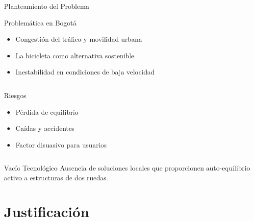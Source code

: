 \documentclass[10pt,xcolor={dvipsnames}]{beamer}
\begin{document}
\begin{frame}{Planteamiento del Problema}
\begin{block}{Problemática en Bogotá}
\begin{itemize}
    \item Congestión del tráfico y movilidad urbana
    \item La bicicleta como alternativa sostenible
    \item Inestabilidad en condiciones de baja velocidad
\end{itemize}
\end{block}

\begin{columns}
\begin{alertblock}{Riesgos}
\begin{itemize}
    \item Pérdida de equilibrio
    \item Caídas y accidentes
    \item Factor disuasivo para usuarios
\end{itemize}
\end{alertblock}

\vspace{0.2cm}
\end{columns}

\vspace{0.3cm}
\begin{block}{Vacío Tecnológico}
Ausencia de soluciones locales que proporcionen auto-equilibrio activo a estructuras de dos ruedas.
\end{block}
\end{frame}

\section{Justificación}
\end{document}
